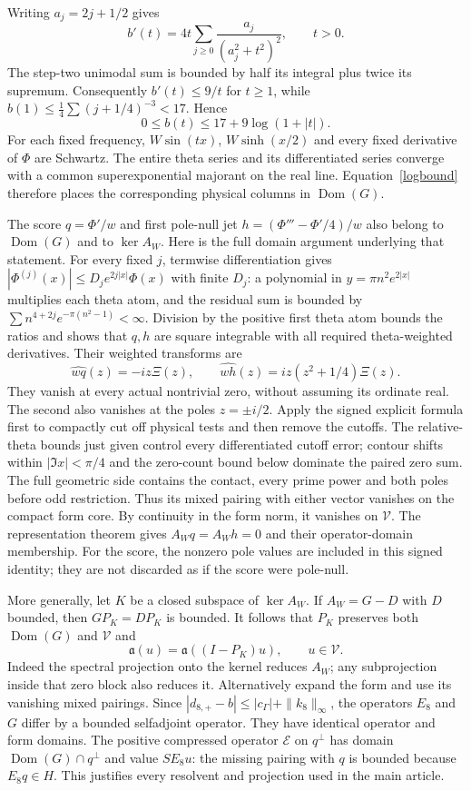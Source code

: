 \documentclass[11pt]{article}
\newcommand{\Dom}{\operatorname{Dom}}
\numberwithin{equation}{section}
\begin{document}
Writing $a_j=2j+1/2$ gives
\[
 b'(t)=4t\sum_{j\ge0}\frac{a_j}{(a_j^2+t^2)^2},\qquad t>0.
\]
The step-two unimodal sum is bounded by half its integral plus twice
its supremum. Consequently $b'(t)\le9/t$ for $t\ge1$, while
$b(1)\le\tfrac14\sum(j+1/4)^{-3}<17$. Hence
\begin{equation}\label{logbound}
 0\le b(t)\le17+9\log(1+|t|).
\end{equation}
For each fixed frequency, $W\sin(tx)$, $W\sinh(x/2)$ and every
fixed derivative of $\Phi$ are Schwartz. The entire theta series and
its differentiated series converge with a common superexponential
majorant on the real line. Equation~\eqref{logbound} therefore places
the corresponding physical columns in $\Dom(G)$.

The score $q=\Phi'/w$ and first pole-null jet
$h=(\Phi'''-\Phi'/4)/w$ also belong to $\Dom(G)$ and to
$\ker A_W$. Here is the full domain argument underlying that statement.
For every fixed $j$, termwise differentiation gives
$|\Phi^{(j)}(x)|\le D_j e^{2j|x|}\Phi(x)$ with finite $D_j$:
a polynomial in $y=\pi n^2e^{2|x|}$ multiplies each theta atom, and
the residual sum is bounded by
$\sum n^{4+2j}e^{-\pi(n^2-1)}<\infty$. Division by the positive
first theta atom bounds the ratios and shows that $q,h$ are square
integrable with all required theta-weighted derivatives. Their
weighted transforms are
\[
 \widehat{wq}(z)=-iz\Xi(z),\qquad
 \widehat{wh}(z)=iz(z^2+1/4)\Xi(z).
\]
They vanish at every actual nontrivial zero, without assuming its
ordinate real. The second also vanishes at the poles $z=\pm i/2$.
Apply the signed explicit formula first to compactly cut off physical
tests and then remove the cutoffs. The relative-theta bounds just given
control every differentiated cutoff error; contour shifts within
$|\Im x|<\pi/4$ and the zero-count bound below dominate the paired
zero sum. The full geometric side contains the contact, every prime
power and both poles before odd restriction. Thus its mixed pairing
with either vector vanishes on the compact form core. By continuity
in the form norm, it vanishes on $\mathcal V$. The representation
theorem gives $A_Wq=A_Wh=0$ and their operator-domain membership.
For the score, the nonzero pole values are included in this signed
identity; they are not discarded as if the score were pole-null.

More generally, let $K$ be a closed subspace of $\ker A_W$. If
$A_W=G-D$ with $D$ bounded, then $GP_K=DP_K$ is bounded. It follows
that $P_K$ preserves both $\Dom(G)$ and $\mathcal V$ and
\begin{equation}\label{kerneltransfer}
 \mathfrak a(u)=\mathfrak a((I-P_K)u),\qquad u\in\mathcal V.
\end{equation}
Indeed the spectral projection onto the kernel reduces $A_W$;
any subprojection inside that zero block also reduces it. Alternatively
expand the form and use its vanishing mixed pairings. Since
$|d_{8,+}-b|\le |c_\Gamma|+\|k_8\|_\infty$, the operators $E_8$
and $G$ differ by a bounded selfadjoint operator. They have identical
operator and form domains. The positive compressed operator
$\mathcal E$ on $q^\perp$ has domain $\Dom(G)\cap q^\perp$ and
value $SE_8u$: the missing pairing with $q$ is bounded because
$E_8q\in H$. This justifies every resolvent and projection used in
the main article.
\end{document}
